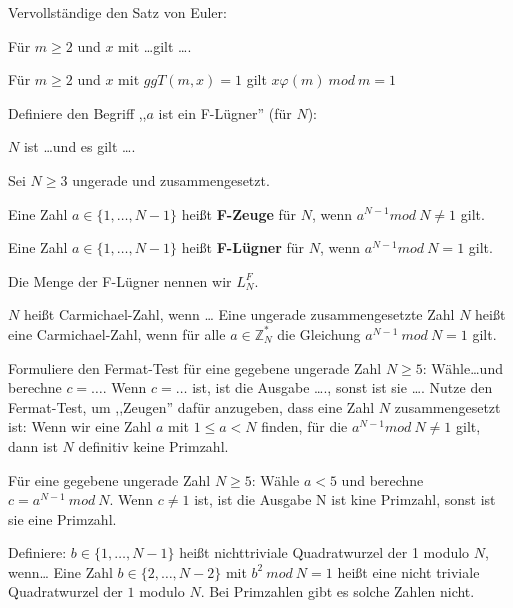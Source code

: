 \documentclass[avery5371, frame]{flashcards}
\begin{document}
\begin{flashcard}[Zahlentheorie]{ Vervollständige den Satz von Euler:

        Für $m\geq 2$ und $x$ mit \dots gilt \dots .}
    Für $m\geq 2$ und $x$ mit $ggT(m,x) = 1$ gilt $x\varphi(m)\ mod\ m=1$
\end{flashcard}

\begin{flashcard}[Primzahlen]{Definiere den Begriff ,,$a$ ist ein F-Lügner'' (für $N$):

        $N$ ist \dots und es gilt \dots .}
    Sei $N\geq 3$ ungerade und zusammengesetzt.

    Eine Zahl $a\in\{1,\dots,N-1\}$ heißt \textbf{F-Zeuge} für $N$, wenn $a^{N-1} mod\ N\not= 1$ gilt.

    Eine Zahl $a\in\{1,\dots,N-1\}$ heißt \textbf{F-Lügner} für $N$, wenn $a^{N-1} mod\ N=1$ gilt.

    Die Menge der F-Lügner nennen wir $L^F_N$.
\end{flashcard}

\begin{flashcard}[Primzahlen]{$N$ heißt Carmichael-Zahl, wenn \dots}
    Eine ungerade zusammengesetzte Zahl $N$ heißt eine Carmichael-Zahl, wenn für alle $a\in\mathbb{Z}^*_N$ die Gleichung $a^{N-1}\ mod\ N= 1$ gilt.
\end{flashcard}

\begin{flashcard}[Primzahlen]{Formuliere den Fermat-Test für eine gegebene ungerade Zahl $N\geq 5$: Wähle\dots und berechne $c=\dots$. Wenn $c=\dots$ ist, ist die Ausgabe \dots., sonst ist sie \dots .}
    Nutze den Fermat-Test, um ,,Zeugen'' dafür anzugeben, dass eine Zahl $N$ zusammengesetzt ist: Wenn wir eine Zahl $a$ mit $1\leq a < N$ finden, für die $a^{N-1} mod\ N\not=1$ gilt, dann ist $N$ definitiv keine Primzahl.

    Für eine gegebene ungerade Zahl $N\geq 5$: Wähle $a<5$ und berechne $c=a^{N-1}\ mod\ N$. Wenn $c\not=1$ ist, ist die Ausgabe N ist kine Primzahl, sonst ist sie eine Primzahl.
\end{flashcard}

\begin{flashcard}[Primzahlen]{Definiere: $b\in\{1,\dots,N-1\}$ heißt nichttriviale Quadratwurzel der 1 modulo $N$, wenn\dots}
    Eine Zahl $b\in\{2,\dots,N-2\}$ mit $b^2\ mod\ N=1$ heißt eine nicht triviale Quadratwurzel der $1$ modulo $N$. Bei Primzahlen gibt es solche Zahlen nicht.
\end{flashcard}
\end{document}
